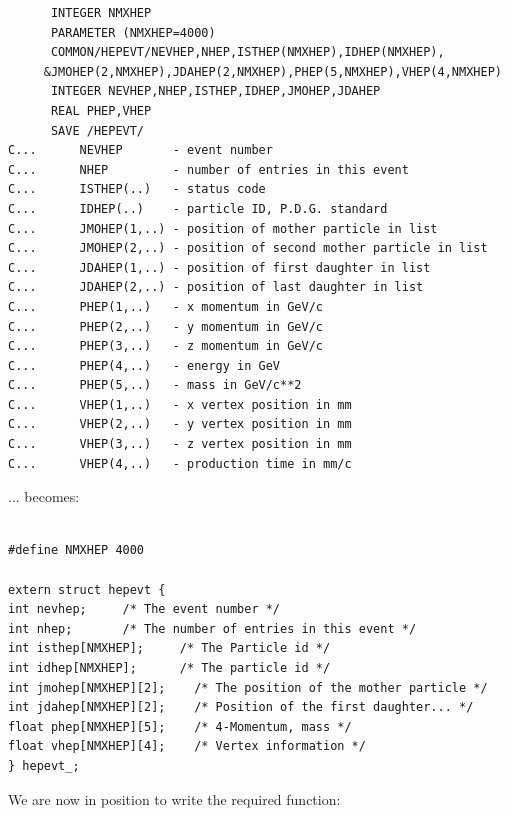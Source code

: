 \begin{verbatim}
      INTEGER NMXHEP
      PARAMETER (NMXHEP=4000)
      COMMON/HEPEVT/NEVHEP,NHEP,ISTHEP(NMXHEP),IDHEP(NMXHEP),
     &JMOHEP(2,NMXHEP),JDAHEP(2,NMXHEP),PHEP(5,NMXHEP),VHEP(4,NMXHEP)
      INTEGER NEVHEP,NHEP,ISTHEP,IDHEP,JMOHEP,JDAHEP
      REAL PHEP,VHEP
      SAVE /HEPEVT/
C...      NEVHEP       - event number
C...      NHEP         - number of entries in this event
C...      ISTHEP(..)   - status code
C...      IDHEP(..)    - particle ID, P.D.G. standard
C...      JMOHEP(1,..) - position of mother particle in list
C...      JMOHEP(2,..) - position of second mother particle in list
C...      JDAHEP(1,..) - position of first daughter in list
C...      JDAHEP(2,..) - position of last daughter in list
C...      PHEP(1,..)   - x momentum in GeV/c
C...      PHEP(2,..)   - y momentum in GeV/c
C...      PHEP(3,..)   - z momentum in GeV/c
C...      PHEP(4,..)   - energy in GeV
C...      PHEP(5,..)   - mass in GeV/c**2
C...      VHEP(1,..)   - x vertex position in mm
C...      VHEP(2,..)   - y vertex position in mm
C...      VHEP(3,..)   - z vertex position in mm
C...      VHEP(4,..)   - production time in mm/c
\end{verbatim}

... becomes:

\begin{verbatim}

#define NMXHEP 4000

extern struct hepevt {
int nevhep;		/* The event number */
int nhep;		/* The number of entries in this event */
int isthep[NMXHEP]; 	/* The Particle id */
int idhep[NMXHEP];      /* The particle id */
int jmohep[NMXHEP][2];    /* The position of the mother particle */
int jdahep[NMXHEP][2];    /* Position of the first daughter... */
float phep[NMXHEP][5];    /* 4-Momentum, mass */
float vhep[NMXHEP][4];    /* Vertex information */
} hepevt_;
\end{verbatim}

We are now in position to write the required function:

